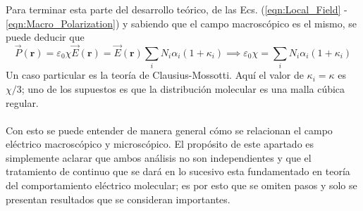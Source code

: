 \documentclass[12pt, oneside, numbers, spanish]{ezthesis}
\numberwithin{equation}{section}
\begin{document}
Para terminar esta parte del desarrollo teórico, de las Ecs. (\ref{eqn:Local_Field} - \ref{eqn:Macro_Polarization}) y sabiendo que el campo macroscópico es el mismo, se puede deducir que
\begin{equation}
\vec{P}(\mathbf{r}) = \varepsilon_0\chi\vec{E}(\mathbf{r}) = \vec{E}(\mathbf{r})\sum_iN_i\alpha_i(1+\kappa_i) \implies \varepsilon_0\chi = \sum_iN_i\alpha_i(1+\kappa_i)
\end{equation}
Un caso particular es la teoría de Clausius-Mossotti. Aquí el valor de $\kappa_i = \kappa$ es $\chi/3$; uno de los supuestos es que la distribución molecular es una malla cúbica regular.\\\\
Con esto se puede entender de manera general cómo se relacionan el campo eléctrico macroscópico y microscópico. El propósito de este apartado es simplemente aclarar que ambos análisis no son independientes y que el tratamiento de continuo que se dará en lo sucesivo esta fundamentado en teoría del comportamiento eléctrico molecular; es por esto que se omiten pasos y solo se presentan resultados que se consideran importantes.
\end{document}
